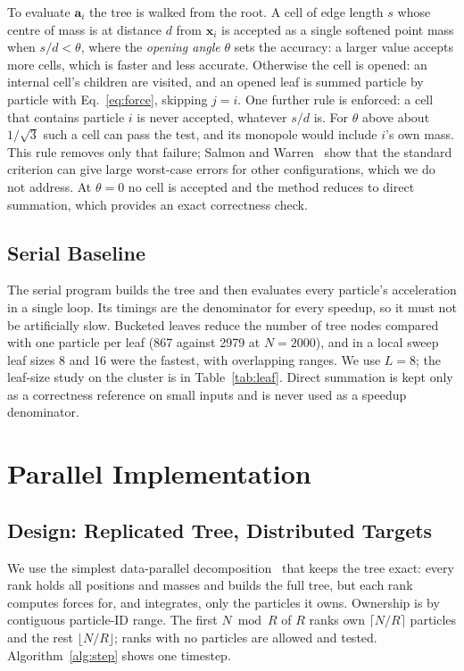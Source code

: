 \documentclass[10pt,a4paper,twocolumn,twoside]{rho-class/rho}
\begin{document}
To evaluate $\mathbf{a}_i$ the tree is walked from the root. A cell of edge length $s$ whose centre of mass is at distance $d$ from $\mathbf{x}_i$ is accepted as a single softened point mass when $s/d < \theta$, where the \emph{opening angle} $\theta$ sets the accuracy: a larger value accepts more cells, which is faster and less accurate. Otherwise the cell is opened: an internal cell's children are visited, and an opened leaf is summed particle by particle with Eq.~\eqref{eq:force}, skipping $j=i$. One further rule is enforced: a cell that contains particle $i$ is never accepted, whatever $s/d$ is. For $\theta$ above about $1/\sqrt{3}$ such a cell can pass the test, and its monopole would include $i$'s own mass. This rule removes only that failure; Salmon and Warren~\cite{SalmonWarren1994} show that the standard criterion can give large worst-case errors for other configurations, which we do not address. At $\theta = 0$ no cell is accepted and the method reduces to direct summation, which provides an exact correctness check.

\subsection{Serial Baseline}
The serial program builds the tree and then evaluates every particle's acceleration in a single loop. Its timings are the denominator for every speedup, so it must not be artificially slow. Bucketed leaves reduce the number of tree nodes compared with one particle per leaf (867 against 2979 at $N=2000$), and in a local sweep leaf sizes 8 and 16 were the fastest, with overlapping ranges. We use $L=8$; the leaf-size study on the cluster is in Table~\ref{tab:leaf}. Direct summation is kept only as a correctness reference on small inputs and is never used as a speedup denominator.

\section{Parallel Implementation}
\label{sec:parallel}
\subsection{Design: Replicated Tree, Distributed Targets}
We use the simplest data-parallel decomposition~\cite{Lecture7,Lecture12} that keeps the tree exact: every rank holds all positions and masses and builds the full tree, but each rank computes forces for, and integrates, only the particles it owns. Ownership is by contiguous particle-ID range. The first $N \bmod R$ of $R$ ranks own $\lceil N/R \rceil$ particles and the rest $\lfloor N/R \rfloor$; ranks with no particles are allowed and tested. Algorithm~\ref{alg:step} shows one timestep.
\end{document}
